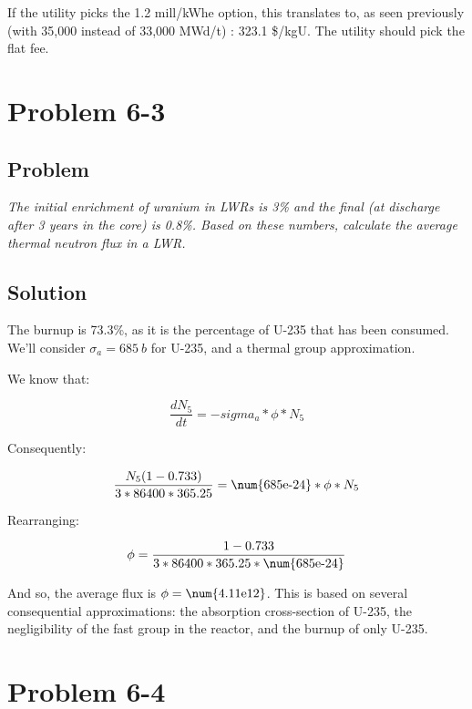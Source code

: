 If the utility picks the 1.2 mill/kWhe option, this translates to, as seen previously (with 35,000 instead of 33,000 MWd/t) : 323.1 \$/kgU. The utility should pick the flat fee.



\section{Problem 6-3}
\label{prob63}


\subsection{Problem}
\textit{The initial enrichment of uranium in LWRs is 3\% and the final (at discharge after 3 years in the core) is 0.8\%. Based on these numbers, calculate the average thermal neutron flux in a LWR.}

\subsection{Solution}

The burnup is 73.3\%, as it is the percentage of U-235 that has been consumed. We'll consider $\sigma_a = 685\ b$ for U-235, and a thermal group approximation.

We know that:

\begin{equation}
\frac{dN_5}{dt} = -sigma_a * \phi * N_5
\end{equation}

Consequently:

\begin{equation}
\frac{N_5(1-0.733)}{3 * 86400 * 365.25} = \text{\num{685e-24}} * \phi * N_5
\end{equation}

Rearranging:


\begin{equation}
\phi = \frac{1-0.733}{3 * 86400 * 365.25 * \text{\num{685e-24}}}
\end{equation}

And so, the average flux is $\phi = \text{\num{4.11e12}}$. This is based on several consequential approximations: the absorption cross-section of U-235, the negligibility of the fast group in the reactor, and the burnup of only U-235.

\section{Problem 6-4}
\label{prob64}


